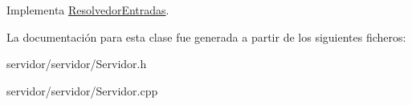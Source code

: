 \-Implementa \hyperlink{classResolvedorEntradas_a197be7d4db0a07250a51c2c390dd2372}{\-Resolvedor\-Entradas}.



\-La documentación para esta clase fue generada a partir de los siguientes ficheros\-:\begin{DoxyCompactItemize}
\item 
servidor/servidor/\-Servidor.\-h\item 
servidor/servidor/\-Servidor.\-cpp\end{DoxyCompactItemize}
